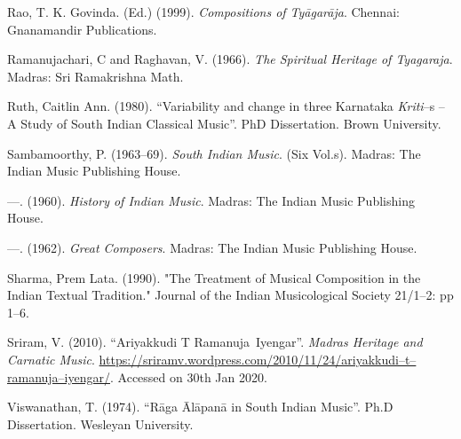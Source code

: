\begin{thebibliography}{99}
  Rao, T. K. Govinda. (Ed.) (1999). \textit{Compositions of Tyāgarāja}. Chennai: Gnanamandir Publications.

  Ramanujachari, C and Raghavan, V. (1966). \textit{The Spiritual Heritage of Tyagaraja}. Madras: Sri Ramakrishna Math.

  Ruth, Caitlin Ann. (1980). “Variability and change in three Karnataka \textit{Kriti}–s – A Study of South Indian Classical Music”. PhD Dissertation. Brown University.

  Sambamoorthy, P. (1963–69). \textit{South Indian Music}. (Six Vol.s). Madras: The Indian Music Publishing House.

  —. (1960). \textit{History of Indian Music}. Madras: The Indian Music Publishing House.

  —. (1962). \textit{Great Composers}. Madras: The Indian Music Publishing House.

  Sharma, Prem Lata. (1990). "The Treatment of Musical Composition in the Indian Textual Tradition." Journal of the Indian Musicological Society 21/1–2: pp 1–6.

  Sriram, V. (2010). “Ariyakkudi T Ramanuja Iyengar”. \textit{Madras Heritage and Carnatic Music}. \url{https://sriramv.wordpress.com/2010/11/24/ariyakkudi–t–ramanuja–iyengar/}. Accessed on 30th Jan 2020.

  Viswanathan, T. (1974). “Rāga Ālāpanā in South Indian Music”. Ph.D Dissertation. Wesleyan University.

 \end{thebibliography}

